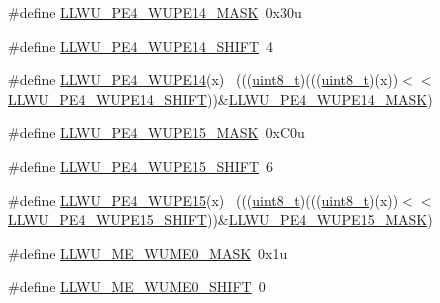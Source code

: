 \begin{DoxyCompactItemize}
\item 
\#define \hyperlink{group___l_l_w_u___register___masks_gae3a1e7b7497f719cfebd559f31dc4d07}{L\+L\+W\+U\+\_\+\+P\+E4\+\_\+\+W\+U\+P\+E14\+\_\+\+M\+A\+SK}~0x30u
\item 
\#define \hyperlink{group___l_l_w_u___register___masks_ga1942d07f99eb5afb836650dcfb2185af}{L\+L\+W\+U\+\_\+\+P\+E4\+\_\+\+W\+U\+P\+E14\+\_\+\+S\+H\+I\+FT}~4
\item 
\#define \hyperlink{group___l_l_w_u___register___masks_ga6d2ccf1ee3bb00a3c57a1ccb073b60b3}{L\+L\+W\+U\+\_\+\+P\+E4\+\_\+\+W\+U\+P\+E14}(x)                                          ~(((\hyperlink{_p_e___types_8h_aba7bc1797add20fe3efdf37ced1182c5}{uint8\+\_\+t})(((\hyperlink{_p_e___types_8h_aba7bc1797add20fe3efdf37ced1182c5}{uint8\+\_\+t})(x))$<$$<$\hyperlink{group___l_l_w_u___register___masks_ga1942d07f99eb5afb836650dcfb2185af}{L\+L\+W\+U\+\_\+\+P\+E4\+\_\+\+W\+U\+P\+E14\+\_\+\+S\+H\+I\+FT}))\&\hyperlink{group___l_l_w_u___register___masks_gae3a1e7b7497f719cfebd559f31dc4d07}{L\+L\+W\+U\+\_\+\+P\+E4\+\_\+\+W\+U\+P\+E14\+\_\+\+M\+A\+SK})
\item 
\#define \hyperlink{group___l_l_w_u___register___masks_ga53e48ffd153996ab89adb3c4df7511ee}{L\+L\+W\+U\+\_\+\+P\+E4\+\_\+\+W\+U\+P\+E15\+\_\+\+M\+A\+SK}~0x\+C0u
\item 
\#define \hyperlink{group___l_l_w_u___register___masks_gaeaf1e05b8de75133c46d6f11b3346732}{L\+L\+W\+U\+\_\+\+P\+E4\+\_\+\+W\+U\+P\+E15\+\_\+\+S\+H\+I\+FT}~6
\item 
\#define \hyperlink{group___l_l_w_u___register___masks_gaa8cf72eace0e0615ae08b40bbf46fa1b}{L\+L\+W\+U\+\_\+\+P\+E4\+\_\+\+W\+U\+P\+E15}(x)                                          ~(((\hyperlink{_p_e___types_8h_aba7bc1797add20fe3efdf37ced1182c5}{uint8\+\_\+t})(((\hyperlink{_p_e___types_8h_aba7bc1797add20fe3efdf37ced1182c5}{uint8\+\_\+t})(x))$<$$<$\hyperlink{group___l_l_w_u___register___masks_gaeaf1e05b8de75133c46d6f11b3346732}{L\+L\+W\+U\+\_\+\+P\+E4\+\_\+\+W\+U\+P\+E15\+\_\+\+S\+H\+I\+FT}))\&\hyperlink{group___l_l_w_u___register___masks_ga53e48ffd153996ab89adb3c4df7511ee}{L\+L\+W\+U\+\_\+\+P\+E4\+\_\+\+W\+U\+P\+E15\+\_\+\+M\+A\+SK})
\item 
\#define \hyperlink{group___l_l_w_u___register___masks_ga5f1588218d510ac13093055708ceae49}{L\+L\+W\+U\+\_\+\+M\+E\+\_\+\+W\+U\+M\+E0\+\_\+\+M\+A\+SK}~0x1u
\item 
\#define \hyperlink{group___l_l_w_u___register___masks_ga7f653f4ce89c4512437c0114f4659502}{L\+L\+W\+U\+\_\+\+M\+E\+\_\+\+W\+U\+M\+E0\+\_\+\+S\+H\+I\+FT}~0

\end{DoxyCompactItemize}
